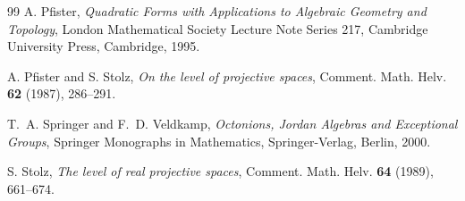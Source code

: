 \documentclass[12pt]{article}
\theoremstyle{plain}
\theoremstyle{definition}
\begin{document}
\begin{thebibliography}{99}
	A. Pfister,
	\emph{Quadratic Forms with Applications to Algebraic Geometry and Topology},
	London Mathematical Society Lecture Note Series 217,
	Cambridge University Press, Cambridge, 1995.
	
	A. Pfister and S. Stolz,
	\emph{On the level of projective spaces},
	Comment. Math. Helv. \textbf{62} (1987), 286--291.
	
	T.~A. Springer and F.~D. Veldkamp,
	\emph{Octonions, Jordan Algebras and Exceptional Groups},
	Springer Monographs in Mathematics,
	Springer-Verlag, Berlin, 2000.
	
	S. Stolz,
	\emph{The level of real projective spaces},
	Comment. Math. Helv. \textbf{64} (1989), 661--674.
	
\end{thebibliography}
\end{document}
